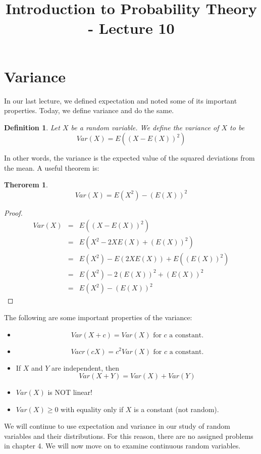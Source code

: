 \documentclass[12pt]{article} %
\title{Introduction to Probability Theory - Lecture 10}
\newtheorem{defn}{Definition}
\newtheorem{thm}{Therorem}
\begin{document}
\maketitle
\section{Variance}
In our last lecture, we defined expectation and noted some of its important properties. Today, we define variance and do the same.
\begin{defn}
Let $X$  be a random variable. We define the \emph{variance} of $X$ to be
$$Var(X) = E\left(\left(X - E(X)\right)^2\right)$$
\end{defn}
In other words, the variance is the expected value of the squared deviations from the mean. A useful theorem is:
\begin{thm}
$$Var(X) = E(X^2)-\left(E(X)\right)^2$$
\end{thm}
\begin{proof}
\begin{eqnarray*}
Var(X) &=& E\left(\left(X - E(X)\right)^2\right)\\
&=& E\left(X^2 - 2XE(X)+\left(E(X)\right)^2\right)\\
&=& E(X^2) - E(2XE(X))+E(\left(E(X)\right)^2)\\
&=& E(X^2) - 2\left(E(X)\right)^2+\left(E(X)\right)^2\\
&=& E(X^2) - \left(E(X)\right)^2
\end{eqnarray*}
\end{proof}
The following are some important properties of the variance:
\begin{itemize}
\item $$Var(X+c) =Var(X) \textrm{ for } c \textrm{ a constant}.$$
\item $$Vacr(cX) = c^2 Var(X) \textrm{ for } c \textrm{ a constant}.$$
\item If $X$ and $Y$ are independent, then
$$Var(X+Y) = Var(X) + Var(Y)$$
\item $Var(X)$ is NOT linear!
\item $Var(X)\geq0$ with equality only if $X$ is a constant (not random). 
\end{itemize}
We will continue to use expectation and variance in our study of random variables and their distributions. For this reason, there are no assigned problems in chapter 4. We will now move on to examine continuous random variables.
\end{document}
